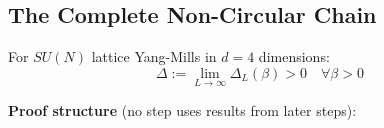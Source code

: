 \subsection{The Complete Non-Circular Chain}

\begin{theorem}
\label{thm:ym-gap-final-noncircular}
For $SU(N)$ lattice Yang-Mills in $d = 4$ dimensions:
\[
\Delta := \lim_{L \to \infty} \Delta_L(\beta) > 0 \quad \forall \beta > 0
\]

\textbf{Proof structure} (no step uses results from later steps):
\end{theorem}

